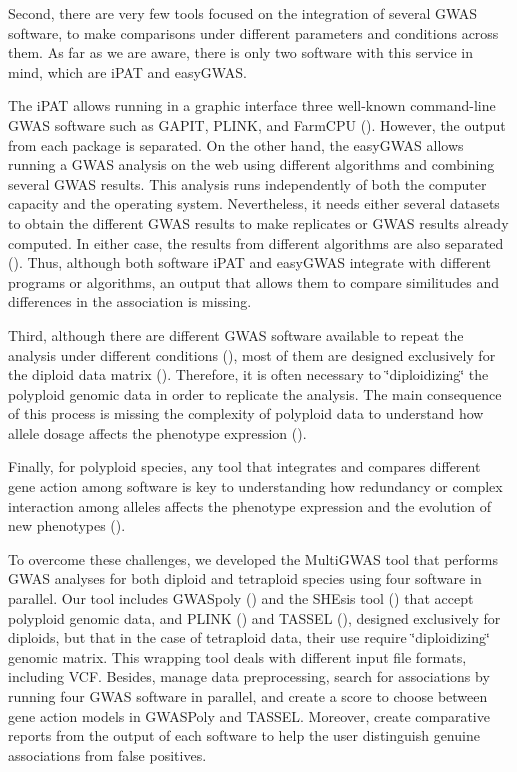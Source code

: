 \documentclass{article}
\begin{document}
Second, there are very few tools focused on the integration of several GWAS software, to make comparisons under different parameters and conditions across them. As far as we are aware, there is only two software with this service in mind, which are iPAT and easyGWAS.

The iPAT allows running in a graphic interface three well-known command-line GWAS software such as GAPIT, PLINK, and FarmCPU (\cite{Zhang2018}). However, the output from each package is separated. On the other hand, the easyGWAS allows running a GWAS analysis on the web using different algorithms and combining several GWAS results. This analysis runs independently of both the computer capacity and the operating system. Nevertheless, it needs either several datasets to obtain the different GWAS results to make replicates or GWAS results already computed. In either case, the results from different algorithms are also separated (\cite{Grimm2017}). Thus, although both software iPAT and easyGWAS integrate with different programs or algorithms, an output that allows them to compare similitudes and differences in the association is missing.

Third, although there are different GWAS software available to repeat the analysis under different conditions (\cite{Gumpinger2018}), most of them are designed exclusively for the diploid data matrix (\cite{Bourke2018}). Therefore, it is often necessary to \char`\"{}diploidizing\char`\"{} the polyploid genomic data in order to replicate the analysis. The main consequence of this process is missing the complexity of polyploid data to understand how allele dosage affects the phenotype expression (\cite{Ferrao2018}).

Finally, for polyploid species, any tool that integrates and compares different gene action among software is key to understanding how redundancy or complex interaction among alleles affects the phenotype expression and the evolution of new phenotypes (\cite{Bourke2018,Rosyara2016,Ferrao2018}).

To overcome these challenges, we developed the MultiGWAS tool that performs GWAS analyses for both diploid and tetraploid species using four software in parallel. Our tool includes GWASpoly (\cite{Rosyara2016}) and the SHEsis tool (\cite{Shen2016}) that accept polyploid genomic data, and PLINK (\cite{Purcell2007}) and TASSEL (\cite{Bradbury2007}), designed exclusively for diploids, but that in the case of tetraploid data, their use require \char`\"{}diploidizing\char`\"{} genomic matrix. This wrapping tool deals with different input file formats, including VCF. Besides, manage data preprocessing, search for associations by running four GWAS software in parallel, and create a score to choose between gene action models in GWASPoly and TASSEL. Moreover, create comparative reports from the output of each software to help the user distinguish genuine associations from false positives.
\end{document}
